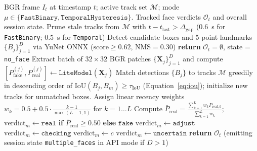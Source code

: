 \begin{algorithm}[htbp]
\caption{Multi-Face $\text{IoU}$ Tracking and Dual-Policy Temporal Decision}
\label{alg:temporal_gate}
\small
\begin{algorithmic}[1]
\Require BGR frame $I_t$ at timestamp $t$; active track set $\mathcal{M}$; mode $\mu \in \{\texttt{FastBinary}, \texttt{TemporalHysteresis}\}$.
\Ensure Tracked face verdicts $\mathcal{O}_t$ and overall session state.
\State Prune stale tracks from $\mathcal{M}$ with $t - t_{\text{last}} > \Delta_{\text{gap}}$ ($0.6$~s for \texttt{FastBinary}; $0.5$~s for \texttt{Temporal})
\State Detect candidate boxes and 5-point landmarks $\{B_j\}_{j=1}^{D}$ via YuNet ONNX ($\text{score} \ge 0.62$, $\text{NMS} = 0.30$)
    \State \textbf{return} $\mathcal{O}_t = \emptyset$, state = \texttt{no\_face}
\EndIf
\State Extract batch of $32\times32$ BGR patches $\{\mathbf{X}_j\}_{j=1}^{D}$ and compute $[P_{\text{fake}}^{(j)}, P_{\text{real}}^{(j)}] \leftarrow \texttt{LiteModel}(\mathbf{X}_j)$
\State Match detections $\{B_j\}$ to tracks $\mathcal{M}$ greedily in descending order of $\text{IoU}(B_j, B_m) \ge \tau_{\text{IoU}}$ (Equation~\eqref{eq:iou}); initialize new tracks for unmatched boxes.
     
        \State Assign linear recency weights $w_k = 0.5 + 0.5 \cdot \frac{k-1}{\max(L-1, 1)}$ for $k = 1 \dots L$
        \State Compute $\bar{P}_{\text{real}} = \frac{\sum_{k=1}^{L} w_k P_{\text{real},k}}{\sum_{k=1}^{L} w_k}$; \quad $\text{verdict}_m \leftarrow \texttt{real}$ \textbf{if} $\bar{P}_{\text{real}} \ge 0.50$ \textbf{else} $\texttt{fake}$
     
            \State $\text{verdict}_m \leftarrow \texttt{adjust}$ 
            \State $\text{verdict}_m \leftarrow \texttt{checking}$
            \State $\text{verdict}_m \leftarrow c$
        \Else
            \State $\text{verdict}_m \leftarrow \texttt{uncertain}$ 
        \EndIf
    \EndIf
\EndFor
\State \textbf{return} $\mathcal{O}_t$ (emitting session state \texttt{multiple\_faces} in API mode if $D > 1$)
\end{algorithmic}
\end{algorithm}

